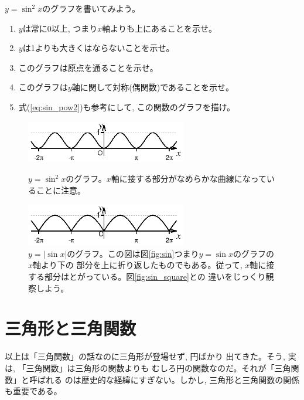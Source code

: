 \begin{q}\label{q:trig_singraph1} $y=\sin^2 x$のグラフを書いてみよう。
\begin{enumerate}
\item $y$は常に0以上, つまり$x$軸よりも上にあることを示せ。
\item $y$は1よりも大きくはならないことを示せ。
\item このグラフは原点を通ることを示せ。
\item このグラフは$y$軸に関して対称(偶関数)であることを示せ。
\item 式(\ref{eq:sin_pow2})も参考にして, この関数のグラフを描け。
\end{enumerate}\end{q}
\begin{figure}[h]
    \centering
    \includegraphics[width=7cm]{sin_square.eps}
    \caption{$y=\sin^2 x$のグラフ\label{fig:sin_square}。$x$軸に接する部分がなめらかな曲線になっていることに注意。}
    \includegraphics[width=7cm]{sin_abs.eps}
    \caption{$y=|\sin x|$のグラフ。この図は図\ref{fig:sin}つまり$y=\sin x$のグラフの$x$軸より下の
部分を上に折り返したものでもある。従って, $x$軸に接する部分はとがっている。図\ref{fig:sin_square}との
違いをじっくり観察しよう。\label{fig:sin_abs}}
\end{figure}

\begin{freqmiss}{\small{}}\end{freqmiss}
\vv



\section{三角形と三角関数}

以上は「三角関数」の話なのに三角形が登場せず, 円ばかり
出てきた。そう, 実は, 「三角関数」は三角形の関数よりも
むしろ円の関数なのだ。それが「三角関数」と呼ばれる
のは歴史的な経緯にすぎない。しかし, 三角形と三角関数の関係も重要である。\mv

